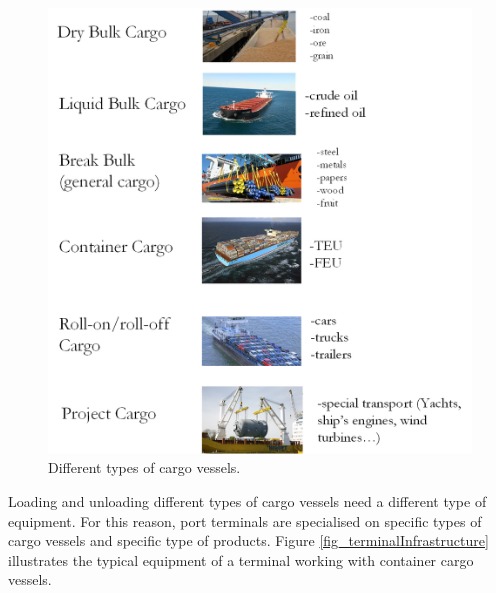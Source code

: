\begin{figure}[hbt!]
\centering
\includegraphics[width=1.0\textwidth]{SectionDistribution/control_figures/fig_cargoProducts.png}
\captionsetup{type=figure}
\caption{Different types of cargo vessels.}
\label{fig_cargoProducts}
\end{figure}

Loading and unloading different types of cargo vessels need a different type of equipment. For this reason, port terminals are specialised on specific types of cargo vessels and specific type of products. Figure \ref{fig_terminalInfrastructure} illustrates the typical equipment of a terminal working with container cargo vessels.

